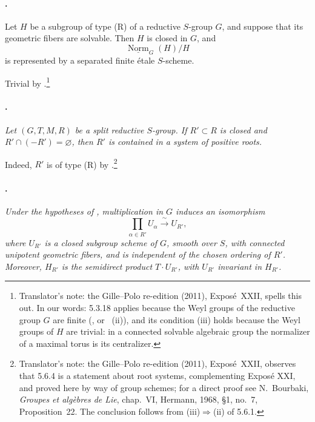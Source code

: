 \paragraph{.}
Let \(H\) be a subgroup of type \textup{(R)} of a reductive
\(S\)-group \(G\), and suppose that its geometric fibers are
solvable. Then \(H\) is closed in \(G\), and
\[
  \underline{\operatorname{Norm}}_G(H)/H
\]
is represented by a separated finite étale \(S\)-scheme.

Trivial by .\footnote{Translator's note: the Gille--Polo re-edition (2011), Exposé~XXII,
spells this out. In our words: 5.3.18 applies because the Weyl groups of the
reductive group \(G\) are finite (, or ~(ii)), and its
condition (iii) holds because the Weyl groups of \(H\) are trivial: in a
connected solvable algebraic group the normalizer of a maximal torus is its
centralizer.}

\paragraph{.}
\textit{Let \((G,T,M,R)\) be a split reductive \(S\)-group. If
\(R'\subset R\) is closed and \(R'\cap(-R')=\varnothing\), then
\(R'\) is contained in a system of positive roots.}

Indeed, \(R'\) is of type \textup{(R)} by .\footnote{Translator's note: the Gille--Polo re-edition (2011), Exposé~XXII,
observes that 5.6.4 is a statement about root systems, complementing Exposé
XXI, and proved here by way of group schemes; for a direct proof see
N.~Bourbaki, \emph{Groupes et algèbres de Lie}, chap.~VI, Hermann, 1968,
\S1, no.~7, Proposition~22. The conclusion follows from (iii)\(\Rightarrow\)(ii)
of 5.6.1.}

\paragraph{.}
\textit{Under the hypotheses of , multiplication
in \(G\) induces an isomorphism}
\[
  \prod_{\alpha\in R'}U_\alpha
  \xrightarrow{\ \sim\ } U_{R'},
\]
\textit{where \(U_{R'}\) is a closed subgroup scheme of \(G\),
smooth over \(S\), with connected unipotent geometric fibers, and is
independent of the chosen ordering of \(R'\). Moreover, \(H_{R'}\)
is the semidirect product \(T\cdot U_{R'}\), with \(U_{R'}\)
invariant in \(H_{R'}\).}


